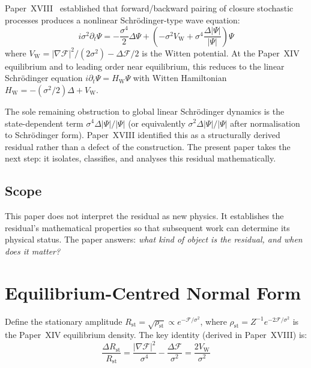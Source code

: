 \documentclass[12pt]{article}
\newcommand{\Fcal}{\mathcal{F}}
\newcommand{\VW}{V_{\mathrm{W}}}
\newcommand{\HW}{H_{\mathrm{W}}}
\newcommand{\Rst}{R_{\mathrm{st}}}
\begin{document}
Paper~XVIII~\citep{SmartXVIII} established that forward/backward pairing of closure stochastic processes produces a nonlinear Schr\"odinger-type wave equation:
\begin{equation}\label{eq:XVIII}
    i\sigma^2\partial_t\Psi = -\frac{\sigma^4}{2}\Delta\Psi + \left(-\sigma^2\VW + \sigma^4\frac{\Delta|\Psi|}{|\Psi|}\right)\Psi
\end{equation}
where $\VW = |\nabla\Fcal|^2/(2\sigma^2) - \Delta\Fcal/2$ is the Witten potential. At the Paper~XIV~\citep{SmartXIV} equilibrium and to leading order near equilibrium, this reduces to the linear Schr\"odinger equation $i\partial_t\Psi = \HW\Psi$ with Witten Hamiltonian $\HW = -(\sigma^2/2)\Delta + \VW$.

The sole remaining obstruction to global linear Schr\"odinger dynamics is the state-dependent term $\sigma^4\Delta|\Psi|/|\Psi|$ (or equivalently $\sigma^2\Delta|\Psi|/|\Psi|$ after normalisation to Schr\"odinger form). Paper~XVIII identified this as a structurally derived residual rather than a defect of the construction. The present paper takes the next step: it isolates, classifies, and analyses this residual mathematically.

\subsection*{Scope}

This paper does not interpret the residual as new physics. It establishes the residual's mathematical properties so that subsequent work can determine its physical status. The paper answers: \textit{what kind of object is the residual, and when does it matter?}

\section{Equilibrium-Centred Normal Form}\label{sec:normalform}

Define the stationary amplitude $\Rst = \sqrt{\rho_{\mathrm{st}}} \propto e^{-\Fcal/\sigma^2}$, where $\rho_{\mathrm{st}} = Z^{-1}e^{-2\Fcal/\sigma^2}$ is the Paper~XIV equilibrium density. The key identity (derived in Paper~XVIII) is:
\begin{equation}\label{eq:equil_identity}
    \frac{\Delta\Rst}{\Rst} = \frac{|\nabla\Fcal|^2}{\sigma^4} - \frac{\Delta\Fcal}{\sigma^2} = \frac{2\VW}{\sigma^2}
\end{equation}
\end{document}
